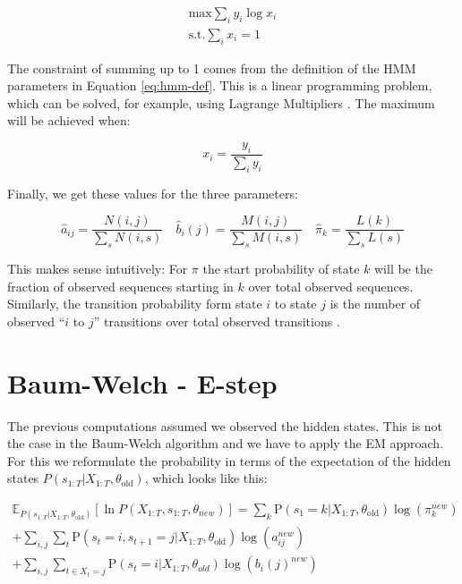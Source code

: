 \begin{equation}
   \begin{aligned}
\text{max} \sum_{i} y_{i} \log x_{i} \\
\text{s.t.} \sum_{i} x_{i}=1
   \end{aligned}
  \label{eq:lp-statement}
\end{equation}

The constraint of summing up to 1 comes from the definition of the HMM parameters in Equation \eqref{eq:hmm-def}. This is a linear programming problem, which can be solved, for example, using Lagrange Multipliers \parencite{huang2001spoken}. The maximum will be achieved when: 

\begin{equation}
  x_{i}=\frac{y_{i}}{\sum_{i} y_{i}} 
  \label{eq:lp-solution}
\end{equation}

Finally, we get these values for the three parameters: 

\begin{equation}
  \hat{a}_{i j}=\frac{N(i, j)}{\sum_{s} N(i, s)} \quad \hat{b}_{i}(j)=\frac{M(i, j)}{\sum_{s} M(i, s)} \quad \hat{\pi}_{k}=\frac{L(k)}{\sum_{s} L(s)} 
\end{equation}

This makes sense intuitively: For $\pi$ the start probability of state $k$ will be the fraction of observed sequences starting in $k$ over total observed sequences. Similarly, the transition probability form state $i$ to state $j$ is the number of observed ``$i$ to $j$'' transitions over total observed transitions \parencite{miningmassivedatasets}. 

\section{Baum-Welch - E-step}

The previous computations assumed we observed the hidden states. This is not the case in the Baum-Welch algorithm and we have to apply the EM approach. For this we reformulate the probability in terms of the expectation of the hidden states $P\left(s_{1: T} | X_{1: T}, \theta_{\text {old}}\right)$, which looks like this:

\begin{equation}
\begin{split}
\mathbb{E}_{P\left(s_{1: T} | X_{1: T}, 
\theta_{\text {old}}\right)}\left[\ln P\left(X_{1: T}, s_{1: T}, \theta_{n e w}\right)\right] 
=\sum_{k} \mathrm{P}\left(s_{1}=k | X_{1: T}, \theta_{\text {old}}\right) \log \left(\pi_{k}^{n e w}\right) \\
+\sum_{i, j} \sum_{t} \mathrm{P}\left(s_{t}=i, s_{t+1}=j | X_{1: T}, \theta_{\text {old}}\right) \log \left(a_{i j}^{n e w}\right) \\
+\sum_{i, j} \sum_{t \in X_t = j} \mathrm{P}\left(s_{t}=i | X_{1: T}, \theta_{o l d}\right)    \log \left(b_{i}(j)^{n e w}\right)
\end{split}
\end{equation}

